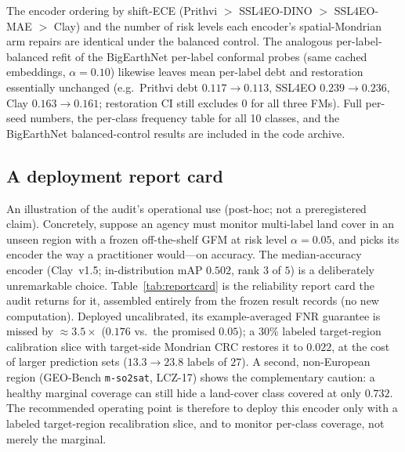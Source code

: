 \documentclass[11pt]{article}
\begin{document}
\noindent The encoder ordering by shift-ECE (Prithvi $>$ SSL4EO-DINO $>$ SSL4EO-MAE $>$ Clay) and the
number of risk levels each encoder's spatial-Mondrian arm repairs are identical under the balanced
control. The analogous per-label-balanced refit of the BigEarthNet per-label conformal probes
(same cached embeddings, $\alpha=0.10$) likewise leaves mean per-label debt and restoration
essentially unchanged (e.g.\ Prithvi debt $0.117\to0.113$, SSL4EO $0.239\to0.236$, Clay
$0.163\to0.161$; restoration CI still excludes $0$ for all three FMs). Full per-seed numbers,
the per-class frequency table for all 10 classes, and the BigEarthNet balanced-control results are
included in the code archive.

\subsection{A deployment report card}\label{sec:reportcard}
An illustration of the audit's operational use (post-hoc; not a preregistered claim). Concretely,
suppose an agency must monitor multi-label land cover in an unseen region with a frozen off-the-shelf GFM
at risk level $\alpha{=}0.05$, and picks its encoder the way a practitioner would---on accuracy. The
median-accuracy encoder (Clay~v1.5; in-distribution mAP $0.502$, rank $3$ of $5$) is a deliberately
unremarkable choice. Table~\ref{tab:reportcard} is the reliability report card the audit returns for it,
assembled entirely from the frozen result records (no new computation). Deployed uncalibrated, its
example-averaged FNR guarantee is missed by ${\approx}3.5\times$ ($0.176$ vs.\ the promised $0.05$); a
$30\%$ labeled target-region calibration slice with target-side Mondrian CRC restores it to $0.022$,
at the cost of larger prediction sets ($13.3\to23.8$ labels of $27$). A second, non-European region
(GEO-Bench \texttt{m-so2sat}, LCZ-17) shows the complementary caution: a healthy marginal coverage can
still hide a land-cover class covered at only $0.732$. The recommended operating point is therefore to
deploy this encoder only with a labeled target-region recalibration slice, and to monitor per-class
coverage, not merely the marginal.
\end{document}
